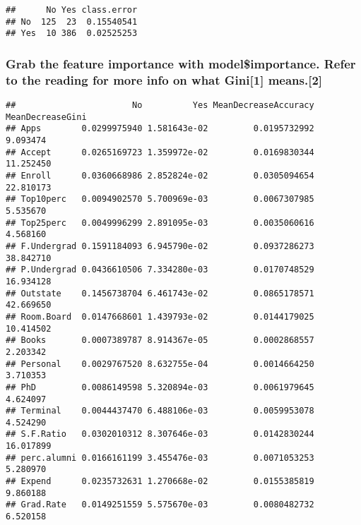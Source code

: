 \documentclass[]{article}
\newenvironment{Shaded}{\begin{snugshade}}{\end{snugshade}}
\newcommand{\NormalTok}[1]{#1}
\newcommand{\OperatorTok}[1]{\textcolor[rgb]{0.81,0.36,0.00}{\textbf{#1}}}
\begin{document}
\begin{Shaded}
\end{Shaded}

\begin{verbatim}
##      No Yes class.error
## No  125  23  0.15540541
## Yes  10 386  0.02525253
\end{verbatim}

\hypertarget{grab-the-feature-importance-with-modelimportance.-refer-to-the-reading-for-more-info-on-what-gini1-means.2}{%
\subsubsection{Grab the feature importance with model\$importance. Refer
to the reading for more info on what Gini{[}1{]}
means.{[}2{]}}\label{grab-the-feature-importance-with-modelimportance.-refer-to-the-reading-for-more-info-on-what-gini1-means.2}}

\begin{Shaded}
\end{Shaded}

\begin{verbatim}
##                       No          Yes MeanDecreaseAccuracy MeanDecreaseGini
## Apps        0.0299975940 1.581643e-02         0.0195732992         9.093474
## Accept      0.0265169723 1.359972e-02         0.0169830344        11.252450
## Enroll      0.0360668986 2.852824e-02         0.0305094654        22.810173
## Top10perc   0.0094902570 5.700969e-03         0.0067307985         5.535670
## Top25perc   0.0049996299 2.891095e-03         0.0035060616         4.568160
## F.Undergrad 0.1591184093 6.945790e-02         0.0937286273        38.842710
## P.Undergrad 0.0436610506 7.334280e-03         0.0170748529        16.934128
## Outstate    0.1456738704 6.461743e-02         0.0865178571        42.669650
## Room.Board  0.0147668601 1.439793e-02         0.0144179025        10.414502
## Books       0.0007389787 8.914367e-05         0.0002868557         2.203342
## Personal    0.0029767520 8.632755e-04         0.0014664250         3.710353
## PhD         0.0086149598 5.320894e-03         0.0061979645         4.624097
## Terminal    0.0044437470 6.488106e-03         0.0059953078         4.524290
## S.F.Ratio   0.0302010312 8.307646e-03         0.0142830244        16.017899
## perc.alumni 0.0166161199 3.455476e-03         0.0071053253         5.280970
## Expend      0.0235732631 1.270668e-02         0.0155385819         9.860188
## Grad.Rate   0.0149251559 5.575670e-03         0.0080482732         6.520158
\end{verbatim}
\end{document}
